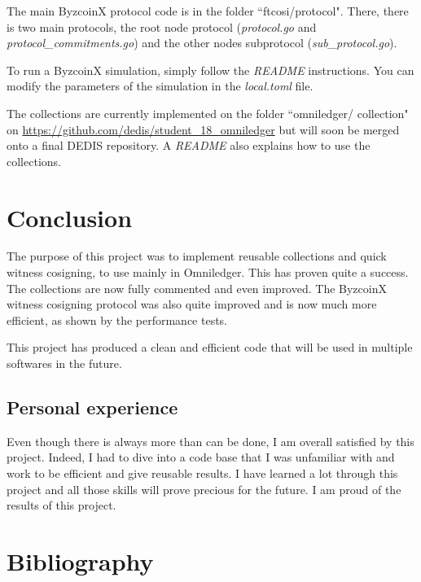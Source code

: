 \documentclass[11pt, a4paper, twoside, openright]{article}
\begin{document}
The main ByzcoinX protocol code is in the folder ``ftcosi/protocol". There, there is two main protocols, the root node protocol (\textit{protocol.go} and \textit{protocol\_commitments.go}) and the other nodes subprotocol (\textit{sub\_protocol.go}).
 
To run a ByzcoinX simulation, simply follow the \textit{README} instructions. You can modify the parameters of the simulation in the \textit{local.toml} file.

The collections are currently implemented on the folder ``omniledger/ collection" on \url{https://github.com/dedis/student_18_omniledger} but will soon be merged onto a final DEDIS repository. A \textit{README} also explains how to use the collections.

\section{Conclusion}
The purpose of this project was to implement reusable collections and quick witness cosigning, to use mainly in Omniledger. This has proven quite a success. The collections are now fully commented and even improved. The ByzcoinX witness cosigning protocol was also quite improved and is now much more efficient, as shown by the performance tests. 

This project has produced a clean and efficient code that will be used in multiple softwares in the future.

\subsection{Personal experience}
Even though there is always more than can be done, I am overall satisfied by this project. Indeed, I had to dive into a code base that I was unfamiliar with and work to be efficient and give reusable results. I have learned a lot through this project and all those skills will prove precious for the future. I am proud of the results of this project.

\section{Bibliography}


\end{document}
